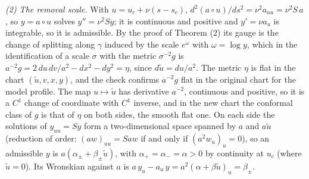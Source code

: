 \emph{(2) The removal scale.} With $u = u_c + \nu(s - s_c)$, $d^2(a\circ u)/ds^2 = \nu^2 a_{uu} = \nu^2 S\,a$, so $y = a\circ u$ solves $y'' = \nu^2 S y$; it is continuous and positive and $y' = \nu a_u$ is integrable, so it is admissible. By the proof of Theorem (2) its gauge is the change of splitting along $\gamma$ induced by the scale $e^{\omega}$ with $\omega = \log y$, which in the identification of a scale $\sigma$ with the metric $\sigma^{-2}g$ is $a^{-2}g = 2\,du\,dv/a^2 - dx^2 - dy^2 = \eta$, since $d\tilde u = du/a^2$. The metric $\eta$ is flat in the chart $(\tilde u, v, x, y)$, and the check confirms $a^{-2}g$ flat in the original chart for the model profile. The map $u \mapsto \tilde u$ has derivative $a^{-2}$, continuous and positive, so it is a $C^1$ change of coordinate with $C^1$ inverse, and in the new chart the conformal class of $g$ is that of $\eta$ on both sides, the smooth flat one. On each side the solutions of $y_{uu} = S y$ form a two-dimensional space spanned by $a$ and $a\tilde u$ (reduction of order: $(a w)_{uu} = S a w$ if and only if $(a^2 w_u)_u = 0$), so an admissible $y$ is $a(\alpha_\pm + \beta_\pm\tilde u)$, with $\alpha_+ = \alpha_- = \alpha > 0$ by continuity at $u_c$ (where $\tilde u = 0$). Its Wronskian against $a$ is $a\,y_u - a_u\,y = a^2(\alpha + \beta\tilde u)_u = \beta_\pm$.

